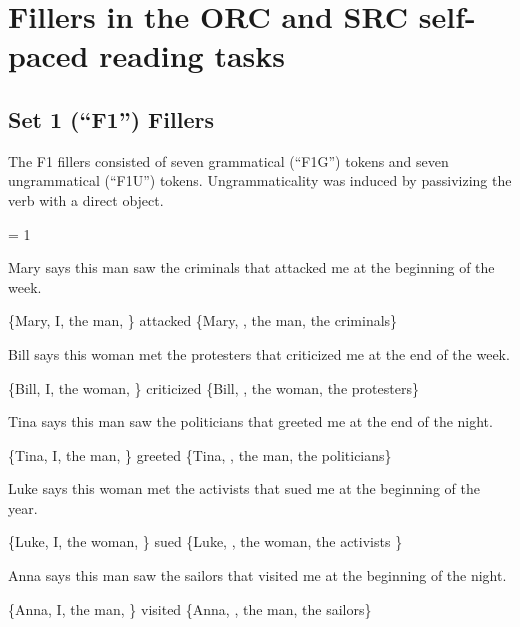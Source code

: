 \section{Fillers in the ORC and SRC self-paced reading tasks}

\subsection{Set 1 (``F1'') Fillers}

\vspace{0.2cm}

The F1 fillers consisted of seven grammatical (``F1G'') tokens and seven ungrammatical (``F1U'') tokens. Ungrammaticality was induced by passivizing the verb with a direct object.

\vspace{0.2cm}

\excnt = 1

\pex %
\a[label=S] Mary says this man saw the criminals that attacked me at the beginning of the week.\par\nobreak
\a[label=Q] \{Mary, I, the man, \} attacked \{Mary, , the man, the criminals\}
\xe

\pex %
\a[label=S] Bill says this woman met the protesters that criticized me at the end of the week.\par\nobreak
\a[label=Q] \{Bill, I, the woman, \} criticized \{Bill, , the woman, the protesters\}
\xe

\pex %
\a[label=S] Tina says this man saw the politicians that greeted me at the end of the night.\par\nobreak
\a[label=Q] \{Tina, I, the man, \} greeted \{Tina, , the man, the politicians\}
\xe

\pex %
\a[label=S] Luke says this woman met the activists that sued me at the beginning of the year.\par\nobreak
\a[label=Q] \{Luke, I, the woman, \} sued \{Luke, , the woman, the activists \}
\xe

\pex %
\a[label=S] Anna says this man saw the sailors that visited me at the beginning of the night.\par\nobreak
\a[label=Q] \{Anna, I, the man, \} visited \{Anna, , the man, the sailors\}
\xe

